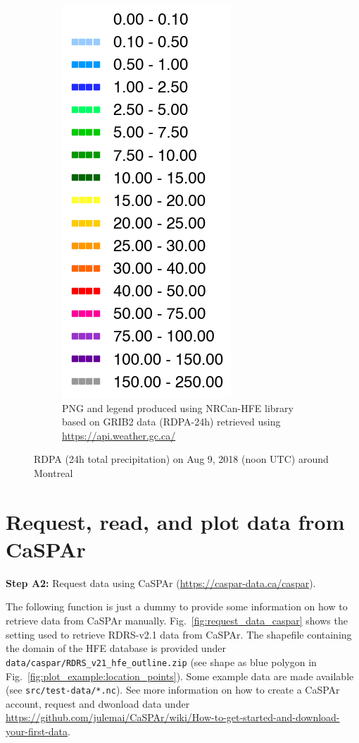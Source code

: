 \documentclass[10pt,a4paper,titlepage,parskip]{scrartcl}
\begin{document}
\begin{figure}[h]
\begin{subfigure}[b]{0.45\textwidth}
		\hspace*{0.5cm}
		\includegraphics[height=0.58\linewidth]{figures/test-map-geomet-nrcan-hfe-rdpa24_legend.png}
		\caption{PNG and legend produced using NRCan-HFE library based on GRIB2 data (RDPA-24h) retrieved using \url{https://api.weather.gc.ca/}}
		\label{fig:plot_example:api-weather}
	\end{subfigure}
	\caption{RDPA (24h total precipitation) on Aug 9, 2018 (noon UTC) around Montreal}
	\label{fig:plot_example_geomet-api_vs_geomet-nrcan-hfe}
\end{figure}

\pagebreak

\section{Request, read, and plot data from CaSPAr}

\textbf{Step A2:} Request data using CaSPAr (\url{https://caspar-data.ca/caspar}).

The following function is just a dummy to provide some information on how to retrieve data from CaSPAr manually. Fig.~\ref{fig:request_data_caspar} shows the setting used to retrieve RDRS-v2.1 data from CaSPAr. The shapefile containing the domain of the HFE database is provided under \texttt{data/caspar/RDRS\_v21\_hfe\_outline.zip} (see shape as blue polygon in Fig.~\ref{fig:plot_example:location_points}). Some example data are made available (see \texttt{src/test-data/*.nc}). See more information on how to create a CaSPAr account, request and dwonload data under \url{https://github.com/julemai/CaSPAr/wiki/How-to-get-started-and-download-your-first-data}.
\end{document}
